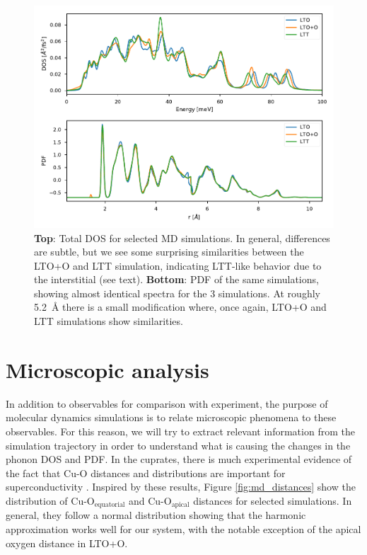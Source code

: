 \begin{figure}
	\centering
	\includegraphics[width=\textwidth]{fig/md/lto_ltt_ltoo_comparison.pdf}
	\caption[MD: DOS and PDF]{\textbf{Top}: Total DOS for selected MD simulations. In general, differences are subtle, but we see some surprising similarities between the LTO+O and LTT simulation, indicating LTT-like behavior due to the interstitial (see text). \textbf{Bottom}: PDF of the same simulations, showing almost identical spectra for the 3 simulations. At roughly \SI{5.2}{\angstrom} there is a small modification where, once again, LTO+O and LTT simulations show similarities.}
	\label{fig:dos_pdf}
\end{figure}

\section{Microscopic analysis}
In addition to observables for comparison with experiment, the purpose of molecular dynamics simulations is to relate microscopic phenomena to these observables. For this reason, we will try to extract relevant information from the simulation trajectory in order to understand what is causing the changes in the phonon DOS and PDF. In the cuprates, there is much experimental evidence of the fact that Cu-O distances and distributions are important for superconductivity \cite{Bozin2000, Peng2017, Ivashko2019}. Inspired by these results, Figure \ref{fig:md_distances} show the distribution of Cu-O$_\text{equatorial}$ and Cu-O$_\text{apical}$ distances for selected simulations. In general, they follow a normal distribution showing that the harmonic approximation works well for our system, with the notable exception of the apical oxygen distance in LTO+O. 

